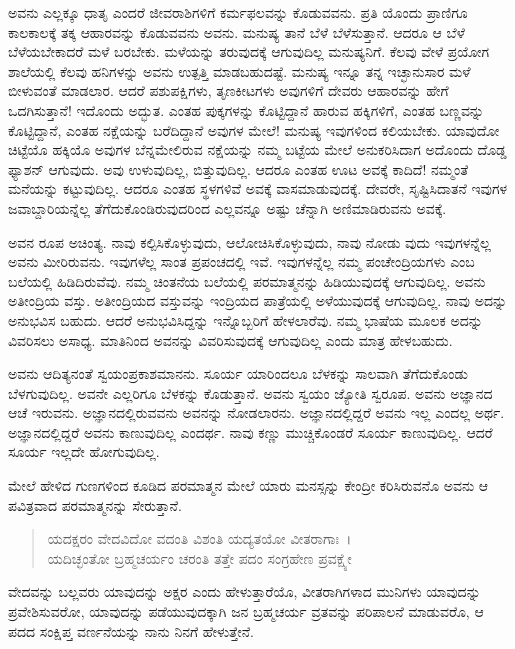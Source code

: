 ಅವನು ಎಲ್ಲಕ್ಕೂ ಧಾತೃ ಎಂದರೆ ಜೀವರಾಶಿಗಳಿಗೆ ಕರ್ಮಫಲವನ್ನು ಕೊಡುವವನು. ಪ್ರತಿ ಯೊಂದು ಪ್ರಾಣಿಗೂ ಕಾಲಕಾಲಕ್ಕೆ ತಕ್ಕ ಆಹಾರವನ್ನು ಕೊಡುವವನು ಅವನು. ಮನುಷ್ಯ ತಾನೆ ಬೆಳೆ ಬೆಳೆಸುತ್ತಾನೆ. ಆದರೂ ಆ ಬೆಳೆ ಬೆಳೆಯಬೇಕಾದರೆ ಮಳೆ ಬರಬೇಕು. ಮಳೆಯನ್ನು ತರುವುದಕ್ಕೆ ಆಗುವುದಿಲ್ಲ ಮನುಷ್ಯನಿಗೆ. ಕೆಲವು ವೇಳೆ ಪ್ರಯೋಗ ಶಾಲೆಯಲ್ಲಿ ಕೆಲವು ಹನಿಗಳನ್ನು ಅವನು ಉತ್ಪತ್ತಿ ಮಾಡಬಹುದಷ್ಟೆ. ಮನುಷ್ಯ ಇನ್ನೂ ತನ್ನ ಇಚ್ಛಾನುಸಾರ ಮಳೆ ಬೀಳುವಂತೆ ಮಾಡಲಾರ. ಆದರೆ ಪಶುಪಕ್ಷಿಗಳು, ತೃಣಕೀಟಗಳು ಅವುಗಳಿಗೆ ದೇವರು ಆಹಾರವನ್ನು ಹೇಗೆ ಒದಗಿಸುತ್ತಾನೆ! ಇದೊಂದು ಅದ್ಭುತ. ಎಂತಹ ಪುಕ್ಕಗಳನ್ನು ಕೊಟ್ಟಿದ್ದಾನೆ ಹಾರುವ ಹಕ್ಕಿಗಳಿಗೆ, ಎಂತಹ ಬಣ್ಣವನ್ನು ಕೊಟ್ಟಿದ್ದಾನೆ, ಎಂತಹ ನಕ್ಷೆಯನ್ನು ಬರೆದಿದ್ದಾನೆ ಅವುಗಳ ಮೇಲೆ! ಮನುಷ್ಯ ಇವುಗಳಿಂದ ಕಲಿಯಬೇಕು. ಯಾವುದೋ ಚಿಟ್ಟೆಯೊ ಹಕ್ಕಿಯೊ ಅವುಗಳ ಬೆನ್ನಮೇಲಿರುವ ನಕ್ಷೆಯನ್ನು ನಮ್ಮ ಬಟ್ಟೆಯ ಮೇಲೆ ಅನುಕರಿಸಿದಾಗ ಅದೊಂದು ದೊಡ್ಡ ಫ್ಯಾಶನ್ ಆಗುವುದು. ಅವು ಉಳುವುದಿಲ್ಲ, ಬಿತ್ತುವುದಿಲ್ಲ. ಆದರೂ ಎಂತಹ ಊಟ ಅವಕ್ಕೆ ಕಾದಿದೆ! ನಮ್ಮಂತೆ ಮನೆಯನ್ನು ಕಟ್ಟುವುದಿಲ್ಲ. ಆದರೂ ಎಂತಹ ಸ್ಥಳಗಳಿವೆ ಅವಕ್ಕೆ ವಾಸಮಾಡುವುದಕ್ಕೆ. ದೇವರೇ, ಸೃಷ್ಟಿಸಿದಾತನೆ ಇವುಗಳ ಜವಾಬ್ದಾರಿಯನ್ನೆಲ್ಲ ತೆಗೆದುಕೊಂಡಿರುವುದರಿಂದ ಎಲ್ಲವನ್ನೂ ಅಷ್ಟು ಚೆನ್ನಾಗಿ ಅಣಿಮಾಡಿರುವನು ಅವಕ್ಕೆ.

ಅವನ ರೂಪ ಅಚಿಂತ್ಯ. ನಾವು ಕಲ್ಪಿಸಿಕೊಳ್ಳುವುದು, ಆಲೋಚಿಸಿಕೊಳ್ಳುವುದು, ನಾವು ನೋಡು ವುದು ಇವುಗಳನ್ನೆಲ್ಲ ಅವನು ಮೀರಿರುವನು. ಇವುಗಳೆಲ್ಲ ಸಾಂತ ಪ್ರಪಂಚದಲ್ಲಿ ಇವೆ. ಇವುಗಳನ್ನೆಲ್ಲ ನಮ್ಮ ಪಂಚೇಂದ್ರಿಯಗಳು ಎಂಬ ಬಲೆಯಲ್ಲಿ ಹಿಡಿದಿರುವೆವು. ನಮ್ಮ ಚಿಂತನೆಯ ಬಲೆಯಲ್ಲಿ ಪರಮಾತ್ಮನನ್ನು ಹಿಡಿಯುವುದಕ್ಕೆ ಆಗುವುದಿಲ್ಲ. ಅವನು ಅತೀಂದ್ರಿಯ ವಸ್ತು. ಅತೀಂದ್ರಿಯದ ವಸ್ತುವನ್ನು ಇಂದ್ರಿಯದ ಪಾತ್ರೆಯಲ್ಲಿ ಅಳೆಯುವುದಕ್ಕೆ ಆಗುವುದಿಲ್ಲ. ನಾವು ಅದನ್ನು ಅನುಭವಿಸ ಬಹುದು. ಆದರೆ ಅನುಭವಿಸಿದ್ದನ್ನು ಇನ್ನೊಬ್ಬರಿಗೆ ಹೇಳಲಾರೆವು. ನಮ್ಮ ಭಾಷೆಯ ಮೂಲಕ ಅದನ್ನು ವಿವರಿಸಲು ಅಸಾಧ್ಯ. ಮಾತಿನಿಂದ ಅವನನ್ನು ವಿವರಿಸುವುದಕ್ಕೆ ಆಗುವುದಿಲ್ಲ ಎಂದು ಮಾತ್ರ ಹೇಳಬಹುದು.

ಅವನು ಆದಿತ್ಯನಂತೆ ಸ್ವಯಂಪ್ರಕಾಶಮಾನನು. ಸೂರ್ಯ ಯಾರಿಂದಲೂ ಬೆಳಕನ್ನು ಸಾಲವಾಗಿ ತೆಗೆದುಕೊಂಡು ಬೆಳಗುವುದಿಲ್ಲ. ಅವನೇ ಎಲ್ಲರಿಗೂ ಬೆಳಕನ್ನು ಕೊಡುತ್ತಾನೆ. ಅವನು ಸ್ವಯಂ ಜ್ಯೋತಿ ಸ್ವರೂಪ. ಅವನು ಅಜ್ಞಾನದ ಆಚೆ ಇರುವನು. ಅಜ್ಞಾನದಲ್ಲಿರುವವನು ಅವನನ್ನು ನೋಡಲಾರನು. ಅಜ್ಞಾನದಲ್ಲಿದ್ದರೆ ಅವನು ಇಲ್ಲ ಎಂದಲ್ಲ ಅರ್ಥ. ಅಜ್ಞಾನದಲ್ಲಿದ್ದರೆ ಅವನು ಕಾಣುವುದಿಲ್ಲ ಎಂದರ್ಥ. ನಾವು ಕಣ್ಣು ಮುಚ್ಚಿಕೊಂಡರೆ ಸೂರ್ಯ ಕಾಣುವುದಿಲ್ಲ. ಆದರೆ ಸೂರ್ಯ ಇಲ್ಲದೇ ಹೋಗುವುದಿಲ್ಲ.

ಮೇಲೆ ಹೇಳಿದ ಗುಣಗಳಿಂದ ಕೂಡಿದ ಪರಮಾತ್ಮನ ಮೇಲೆ ಯಾರು ಮನಸ್ಸನ್ನು ಕೇಂದ್ರೀ ಕರಿಸಿರುವನೊ ಅವನು ಆ ಪವಿತ್ರವಾದ ಪರಮಾತ್ಮನನ್ನು ಸೇರುತ್ತಾನೆ.

\begin{verse}
ಯದಕ್ಷರಂ ವೇದವಿದೋ ವದಂತಿ ವಿಶಂತಿ ಯದ್ಯತಯೋ ವೀತರಾಗಾಃ~।\\ಯದಿಚ್ಛಂತೋ ಬ್ರಹ್ಮಚರ್ಯಂ ಚರಂತಿ ತತ್ತೇ ಪದಂ ಸಂಗ್ರಹೇಣ ಪ್ರವಕ್ಷ್ಯೇ 
\end{verse}

{\small ವೇದವನ್ನು ಬಲ್ಲವರು ಯಾವುದನ್ನು ಅಕ್ಷರ ಎಂದು ಹೇಳುತ್ತಾರೆಯೊ, ವೀತರಾಗಿಗಳಾದ ಮುನಿಗಳು ಯಾವುದನ್ನು ಪ್ರವೇಶಿಸುವರೋ, ಯಾವುದನ್ನು ಪಡೆಯುವುದಕ್ಕಾಗಿ ಜನ ಬ್ರಹ್ಮಚರ್ಯ ವ್ರತವನ್ನು ಪರಿಪಾಲನೆ ಮಾಡುವರೊ, ಆ ಪದದ ಸಂಕ್ಷಿಪ್ತ ವರ್ಣನೆಯನ್ನು ನಾನು ನಿನಗೆ ಹೇಳುತ್ತೇನೆ.}

